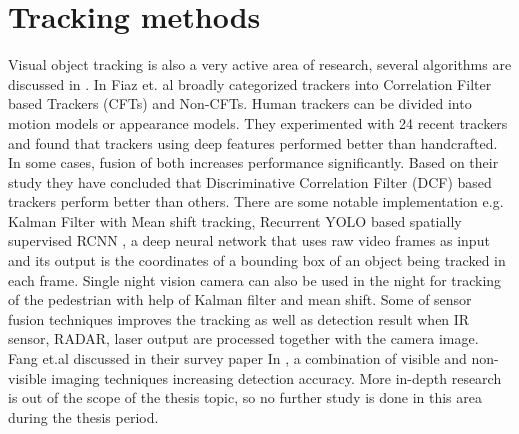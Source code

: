 \section{Tracking methods}
Visual object tracking is also a very active area of research, several algorithms are discussed in \cite{fiaz2019handcrafted,xu2005pedestrian,ning2017spatially}.
In \cite{fiaz2019handcrafted} Fiaz et. al broadly categorized trackers into Correlation Filter based Trackers (CFTs) and Non-CFTs. Human trackers can be divided into motion models or appearance models. They experimented with 24 recent trackers and found that trackers using deep features performed better than handcrafted. In some cases, fusion of both increases performance significantly. Based on their study they have concluded that Discriminative Correlation Filter (DCF) based trackers perform better than others. There are some notable implementation e.g. 
Kalman Filter with Mean shift tracking, Recurrent YOLO based spatially supervised RCNN \cite{ning2017spatially}, a deep neural network that uses raw video frames as input and its output is the coordinates of a bounding box of an object being tracked in each frame. Single night vision camera can also be used in the night for tracking of the pedestrian with help of Kalman filter and mean shift. Some of sensor fusion techniques improves the tracking as well as detection result when IR sensor, RADAR, laser output are processed together with the camera image. Fang et.al discussed in their survey paper In \cite{gonzalez2016pedestrian}, a combination of visible and non-visible imaging techniques increasing detection accuracy. More in-depth research is out of the scope of the thesis topic, so no further study is done in this area during the thesis period.



